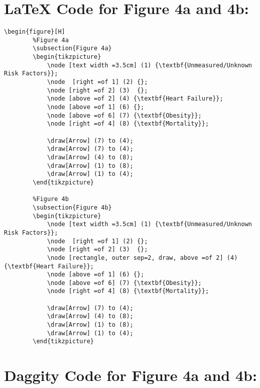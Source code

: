 \documentclass{article}
\begin{document}
\section*{\LaTeX\hspace*{1mm} Code for Figure 4a and 4b:}
\begin{lstlisting}[frame=single, basicstyle=\ttfamily, linewidth=20.5cm]
    \begin{figure}[H]
        %Figure 4a
        \subsection{Figure 4a}
        \begin{tikzpicture}
            \node [text width =3.5cm] (1) {\textbf{Unmeasured/Unknown Risk Factors}};
            \node  [right =of 1] (2) {};
            \node [right =of 2] (3)  {};
            \node [above =of 2] (4) {\textbf{Heart Failure}};
            \node [above =of 1] (6) {};
            \node [above =of 6] (7) {\textbf{Obesity}};
            \node [right =of 4] (8) {\textbf{Mortality}};
            
            \draw[Arrow] (7) to (4);
            \draw[Arrow] (7) to (4);
            \draw[Arrow] (4) to (8);
            \draw[Arrow] (1) to (8);
            \draw[Arrow] (1) to (4);
        \end{tikzpicture}

        %Figure 4b
        \subsection{Figure 4b}
        \begin{tikzpicture}
            \node [text width =3.5cm] (1) {\textbf{Unmeasured/Unknown Risk Factors}};
            \node  [right =of 1] (2) {};
            \node [right =of 2] (3)  {};
            \node [rectangle, outer sep=2, draw, above =of 2] (4) {\textbf{Heart Failure}};
            \node [above =of 1] (6) {};
            \node [above =of 6] (7) {\textbf{Obesity}};
            \node [right =of 4] (8) {\textbf{Mortality}};
            
            \draw[Arrow] (7) to (4);
            \draw[Arrow] (4) to (8);
            \draw[Arrow] (1) to (8);
            \draw[Arrow] (1) to (4);
        \end{tikzpicture}
\end{lstlisting}



\section*{Daggity Code for Figure 4a and 4b:}
\end{document}
